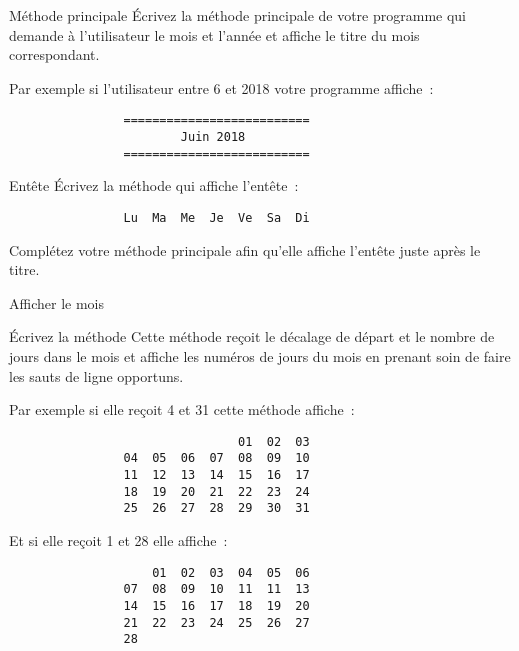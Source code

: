\documentclass[a4paper,11pt]{style-esi/td}
\begin{document}
 	\begin{Exercice}{Méthode principale}
		\'Ecrivez la méthode principale de votre programme qui demande à l'utilisateur le mois et l'année et affiche le titre 
		du mois correspondant.
		
		Par exemple si l'utilisateur entre 6 et 2018 votre programme affiche~:
		\begin{verbatim}
                ==========================
                        Juin 2018
                ========================== 
		\end{verbatim}	

	\end{Exercice} 

\newpage 

 	\begin{Exercice}{Entête}
		\'Ecrivez la méthode 
		qui affiche l'entête~:
		\begin{verbatim}
                Lu  Ma  Me  Je  Ve  Sa  Di
		\end{verbatim}
	
		Complétez votre méthode principale afin qu'elle affiche l'entête juste après le titre. 
	\end{Exercice} 
	
	
 	\begin{Exercice}{Afficher le mois}
	
		\'Ecrivez la méthode 
		Cette méthode reçoit le décalage de départ et le nombre de jours dans le mois 
		et affiche les numéros de jours du mois en prenant soin de faire les sauts de ligne opportuns.
		
		Par exemple si elle reçoit 4 et 31 cette méthode affiche~:
		
		\begin{verbatim}
                                01  02  03   
                04  05  06  07  08  09  10   
                11  12  13  14  15  16  17   
                18  19  20  21  22  23  24   
                25  26  27  28  29  30  31      
		\end{verbatim}

		Et si elle reçoit 1 et 28 elle affiche~:
		
		\begin{verbatim}
                    01  02  03  04  05  06 
                07  08  09  10  11  11  13   
                14  15  16  17  18  19  20   
                21  22  23  24  25  26  27   
                28      
		\end{verbatim}

		
	\end{Exercice} 
\end{document}

